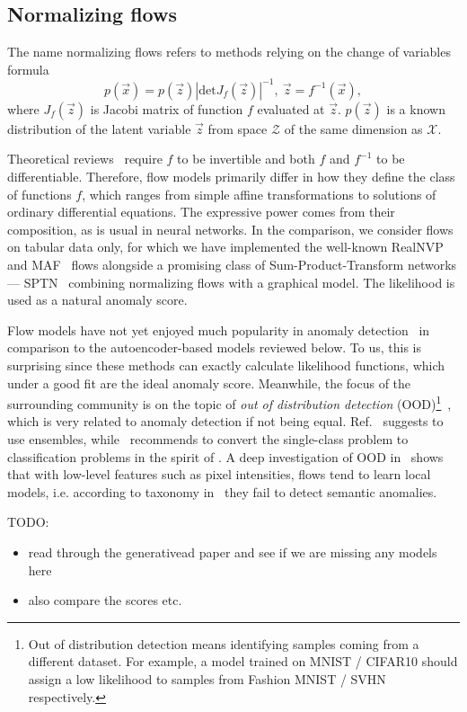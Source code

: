 \subsection{Normalizing flows}
The name normalizing flows refers to methods relying on the change of variables formula
\begin{equation}
    p\left(\vec{x}\right) = p\left(\vec{z}\right)\!\left\vert \text{det} J_f\!\left(\vec{z}\right) \right\vert^{-1}, ~ \vec{z} = f^{-1}\!\left(\vec{x}\right),
\label{eq:rv_transformation}
\end{equation}
where $J_f\!\left(\vec{z}\right)$ is Jacobi matrix of function $f$ evaluated at $\vec{z}$. $p(\vec{z})$ is a known distribution of the latent variable $\vec{z}$ from space $\mathcal{Z}$ of the same dimension as $\mathcal{X}$.

Theoretical reviews~\cite{papamakariosNormalizingFlowsProbabilistic2019, kobyzevNormalizingFlowsIntroduction2020} require $f$ to be invertible and both $f$ and $f^{-1}$ to be differentiable. Therefore, flow models primarily differ in how they define the class of functions $f$, which ranges from simple affine transformations to solutions of ordinary differential equations. The expressive power comes from their composition, as is usual in neural networks. In the comparison, we consider flows on tabular data only, for which we have implemented the well-known RealNVP~\cite{dinh2016density} and MAF~\cite{papamakariosMaskedAutoregressiveFlow2018} flows alongside a promising class of Sum-Product-Transform networks --- SPTN~\cite{pevny2020sum} combining normalizing flows with a graphical model. The likelihood is used as a natural anomaly score.

Flow models have not yet enjoyed much popularity in anomaly detection~\cite{yamaguchi2019adaflow, schmidtNormalizingFlowsNovelty2019, diasAnomalyDetectionTrajectory2020a, pevny2020sum} in comparison to the autoencoder-based models reviewed below. To us, this is surprising since these methods can exactly calculate likelihood functions, which under a good fit are the ideal anomaly score. Meanwhile, the focus of the surrounding community is on the topic of \textit{out of distribution detection} (OOD)\footnote{Out of distribution detection means identifying samples coming from a different dataset. For example, a model trained on MNIST / CIFAR10 should assign a low likelihood to samples from Fashion MNIST / SVHN respectively.}~\cite{nalisnickDeepGenerativeModels2019}, which is very related to anomaly detection if not being equal. Ref.~\cite{choiWAICWhyGenerative2019} suggests to use ensembles, while~\cite{renLikelihoodRatiosOutofDistribution2019} recommends to convert the single-class problem to classification problems in the spirit of \cite{steinwart2005a}. A deep investigation of OOD in~\cite{kirichenkoWhyNormalizingFlows2020} shows that with low-level features such as pixel intensities, flows tend to learn local models, i.e. according to taxonomy in~\cite{ruff2020unifying} they fail to detect semantic anomalies.


TODO:

\begin{itemize}
    \item read through the generativead paper and see if we are missing any models here
    \item also compare the scores etc.
\end{itemize}